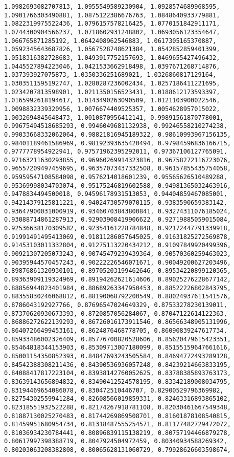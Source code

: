 \documentclass[11pt]{article}
\begin{document}
\begin{Verbatim}[commandchars=\\\{\}]
1.0982693082707813, 1.0955549589230904, 1.0928574689968595, 1.0901766303490881, 1.0875122386676763, 1.0848640933779881, 1.0822319975522436, 1.0796157578216425, 1.0770151842911171, 1.0744300904566237, 1.0718602931248802, 1.0693056123354647, 1.066765871285192, 1.0642408962546883, 1.0617305165370887, 1.0592345643687826, 1.0567528748621384, 1.0542852859401399, 1.0518316382728683, 1.0493917752157693, 1.0469655427496432, 1.0445527894223046, 1.0421533662918498, 1.0397671268714876, 1.037393927075873, 1.0350336251689021, 1.0326860817129164, 1.0303511595192747, 1.0280287236002434, 1.0257186411221695, 1.0234207813598901, 1.0211350156523431, 1.0188612173593397, 1.0165992618194617, 1.0143490263090509, 1.0121103900022546, 1.0098832339320956, 1.0076674409525357, 1.0054628957015022, 1.0032694845648473, 1.0010870956412141, 0.99891561870778001, 0.99675494518685293, 0.9946049681132938, 0.99246558210274238, 0.99033668332062064, 0.98821816945189322, 0.98610993967156135, 0.98401189461586969, 0.98192393635420494, 0.97984596836166715, 0.9777778954922941, 0.97571962395292011, 0.97367106127765091, 0.97163211630293855, 0.96960269914323816, 0.96758272116723076, 0.96557209497459695, 0.96357073437332508, 0.96157855435754058, 0.95959547108584098, 0.9576214018601239, 0.95565626510489288, 0.95369998034703074, 0.95175246819602588, 0.94981365032463916, 0.9478834494500018, 0.94596178931513053, 0.94404859467085001, 0.94214379125811221, 0.94024730579070115, 0.9383590659383142, 0.93647900031000919, 0.93460703843800841, 0.93274311076185024, 0.93088714861287913, 0.92903908419906622, 0.92719885059015084, 0.92536638170309582, 0.92354161228784848, 0.92172447791339918, 0.91991491495413069, 0.91811286057645025, 0.91631825272569878, 0.91453103011332804, 0.91275113220434212, 0.91097849920499396, 0.90921307205073243, 0.90745479239439364, 0.90570360259463023, 0.90395944570457243, 0.90222226546071671, 0.90049200627203496, 0.89876861320930101, 0.89705203199462646, 0.89534220899120365, 0.89363909119324969, 0.89194262621614606, 0.89025276228677142, 0.88856944823401984, 0.88689263347950453, 0.88522226802843795, 0.88355830246068812, 0.88190068792200549, 0.88024937611541576, 0.8786043192927766, 0.87696547024649329, 0.87533278230139011, 0.87370620930673393, 0.8720857056284067, 0.87047122614122363, 0.86886272622139293, 0.86726016173911546, 0.86566348905131996, 0.86407266499453161, 0.8624876468778705, 0.86090839247617734, 0.85933486002326409, 0.85776700820528606, 0.85620479615423351, 0.85464818344153903, 0.85309713007180099, 0.85155159647661616, 0.85001154350852393, 0.84847693243505584, 0.84694772493289128, 0.84542388308211436, 0.84390536936057248, 0.84239214663833195, 0.84088417817223104, 0.83938142760052625, 0.83788385893763173, 0.83639143656894832, 0.83490412524578195, 0.83342189008034795, 0.83194469654086078, 0.830472510446707, 0.82900529796369982, 0.82754302559941284, 0.82608566019859331, 0.82463316893865102, 0.82318551932522288, 0.82174267918781108, 0.82030461667549348, 0.81887130025270483, 0.81744269869508701, 0.81601878108540815, 0.81459951680954734, 0.81318487555254571, 0.81177482729472072, 0.81036934230784441, 0.80896839115138219, 0.80757194466879278, 0.80617997398388719, 0.8047924504972459, 0.80340934588269342, 0.80203063208382808, 0.80065628131060729, 0.79928626603598674, 
\end{Verbatim}
\end{document}
